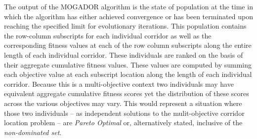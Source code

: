 The output of the MOGADOR algorithm is the state of population at the time in which the algorithm has either achieved convergence or has been terminated upon reaching the specified limit for evolutionary iterations. This population contains the row-column subscripts for each individual corridor as well as the corresponding fitness values at each of the row column subscripts along the entire length of each individual corridor. These individuals are ranked on the basis of their aggregate cumulative fitness values. These values are computed by summing each objective value at each subscript location along the length of each individual corridor. Because this is a multi-objective context two individuals may have equivalent aggregate cumulative fitness scores yet the distribution of these scores across the various objectives may vary. This would represent a situation where those two individuals -- as independent solutions to the mulit-objective corridor location problem -- are \textit{Pareto Optimal} or, alternatively stated, inclusive of the \textit{non-dominated set}.

\clearpage

